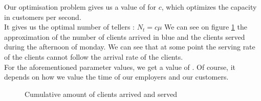 \documentclass[12pt,a4paper,notitlepage]{report}
\begin{document}
Our optimisation problem gives us a value of  for $c$, which optimizes the capacity in customers per second.\\
It gives us the optimal number of tellers : $N_t = c \mu$
We can see on figure \ref{fig:clients_lun} the approximation of the number of clients arrived in blue and the clients served during the afternoon of monday. We can see that at some point the serving rate of the clients cannot follow the arrival rate of the clients. \\
For the aforementioned parameter values, we get a value of . Of course, it depends on how we value the time of our employers and our customers.
\begin{figure}[h]
\centering
{}
\caption{Cumulative amount of clients arrived and served\label{fig:clients_lun}}
\end{figure}
\end{document}
